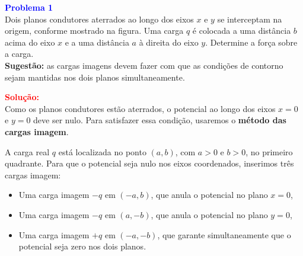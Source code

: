 \documentclass[a4paper,12pt]{article}
\begin{document}
\begin{flushleft}
\textbf{\textcolor{blue}{\Large Problema 1}}\\

Dois planos condutores aterrados ao longo dos eixos \(x\) e \(y\) se 
interceptam na origem, conforme mostrado na figura. Uma carga \(q\) 
é colocada a uma distância \(b\) acima do eixo \(x\) e a uma distância 
\(a\) à direita do eixo \(y\). Determine a força sobre a carga.\\

\noindent
\textbf{Sugestão:} as cargas imagens devem fazer com que as condições de 
contorno sejam mantidas nos dois planos simultaneamente.

\vspace{0.5cm}

\begin{center}
\end{center}

\textcolor{red}{\textbf{Solução:}}\\

Como os planos condutores estão aterrados, o potencial ao longo dos eixos \(x = 0\) e \(y = 0\) deve ser nulo. Para satisfazer essa condição, usaremos o \textbf{método das cargas imagem}.

A carga real \(q\) está localizada no ponto \((a, b)\), com \(a > 0\) e \(b > 0\), no primeiro quadrante. Para que o potencial seja nulo nos eixos coordenados, inserimos três cargas imagem:

\begin{itemize}
  \item Uma carga imagem \(-q\) em \((-a, b)\), que anula o potencial no plano \(x = 0\),
  \item Uma carga imagem \(-q\) em \((a, -b)\), que anula o potencial no plano \(y = 0\),
  \item Uma carga imagem \(+q\) em \((-a, -b)\), que garante simultaneamente que o potencial seja zero nos dois planos.
\end{itemize}


\end{flushleft}
\end{document}
